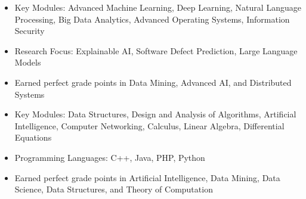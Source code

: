


\begin{itemize}
	\item Key Modules: Advanced Machine Learning, Deep Learning, Natural Language Processing, Big Data Analytics, Advanced Operating Systems, Information Security
	\item Research Focus: Explainable AI, Software Defect Prediction, Large Language Models
	\item Earned perfect grade points in Data Mining, Advanced AI, and Distributed Systems
\end{itemize}

\divider

\begin{itemize}
	\item Key Modules: Data Structures, Design and Analysis of Algorithms, Artificial Intelligence, Computer Networking, Calculus, Linear Algebra, Differential Equations
	\item Programming Languages: C++, Java, PHP, Python
	\item Earned perfect grade points in Artificial Intelligence, Data Mining, Data Science, Data Structures, and Theory of Computation
\end{itemize}
